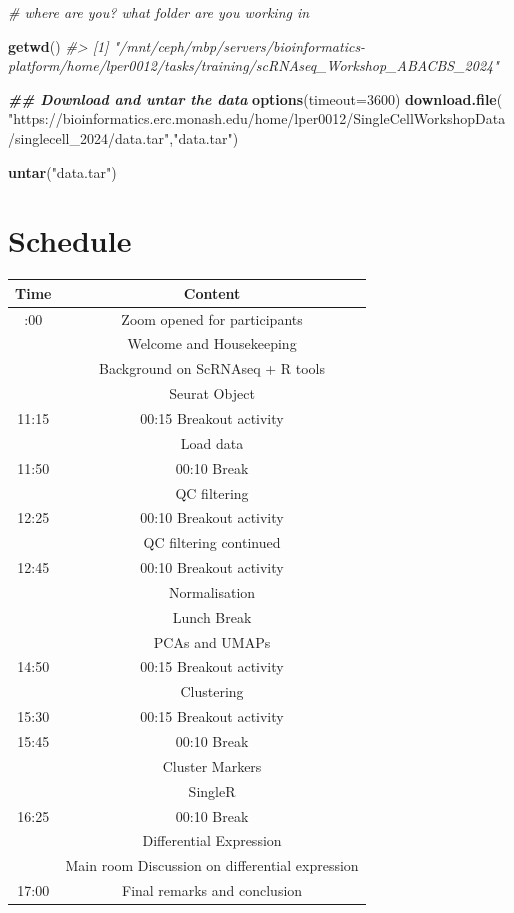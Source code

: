 \documentclass[
]{book}
\newenvironment{Shaded}{\begin{snugshade}}{\end{snugshade}}
\newcommand{\AttributeTok}[1]{\textcolor[rgb]{0.13,0.29,0.53}{#1}}
\newcommand{\CommentTok}[1]{\textcolor[rgb]{0.56,0.35,0.01}{\textit{#1}}}
\newcommand{\DecValTok}[1]{\textcolor[rgb]{0.00,0.00,0.81}{#1}}
\newcommand{\DocumentationTok}[1]{\textcolor[rgb]{0.56,0.35,0.01}{\textbf{\textit{#1}}}}
\newcommand{\FunctionTok}[1]{\textcolor[rgb]{0.13,0.29,0.53}{\textbf{#1}}}
\newcommand{\NormalTok}[1]{#1}
\newcommand{\StringTok}[1]{\textcolor[rgb]{0.31,0.60,0.02}{#1}}
\begin{document}
\begin{Shaded}
\begin{Highlighting}[]
\CommentTok{\# where are you? what folder are you working in}

\FunctionTok{getwd}\NormalTok{()}
\CommentTok{\#\textgreater{} [1] "/mnt/ceph/mbp/servers/bioinformatics{-}platform/home/lper0012/tasks/training/scRNAseq\_Workshop\_ABACBS\_2024"}

\DocumentationTok{\#\# Download and untar the data}
\FunctionTok{options}\NormalTok{(}\AttributeTok{timeout=}\DecValTok{3600}\NormalTok{)}
\FunctionTok{download.file}\NormalTok{(}
    \StringTok{"https://bioinformatics.erc.monash.edu/home/lper0012/SingleCellWorkshopData/singlecell\_2024/data.tar"}\NormalTok{,}\StringTok{"data.tar"}\NormalTok{)}

\FunctionTok{untar}\NormalTok{(}\StringTok{"data.tar"}\NormalTok{)}
\end{Highlighting}
\end{Shaded}

\hypertarget{schedule}{%
\chapter{Schedule}\label{schedule}}

\begin{longtable}[]{@{}cc@{}}
\toprule\noalign{}
Time & Content \\
\midrule\noalign{}
\endhead
\bottomrule\noalign{}
\endlastfoot
10:00 & Zoom opened for participants \\
& Welcome and Housekeeping \\
& Background on ScRNAseq + R tools \\
& Seurat Object \\
11:15 & 00:15 Breakout activity \\
& Load data \\
11:50 & 00:10 Break \\
& QC filtering \\
12:25 & 00:10 Breakout activity \\
& QC filtering continued \\
12:45 & 00:10 Breakout activity \\
& Normalisation \\
& Lunch Break \\
& PCAs and UMAPs \\
14:50 & 00:15 Breakout activity \\
& Clustering \\
15:30 & 00:15 Breakout activity \\
15:45 & 00:10 Break \\
& Cluster Markers \\
& SingleR \\
16:25 & 00:10 Break \\
& Differential Expression \\
& Main room Discussion on differential expression \\
17:00 & Final remarks and conclusion \\
\end{longtable}
\end{document}

